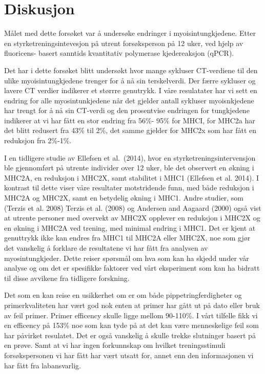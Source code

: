 \documentclass[
  letterpaper,
  DIV=11,
  numbers=noendperiod]{scrreprt}
\begin{document}
\section{Diskusjon}\label{diskusjon-6}

Målet med dette forsøket var å undersøke endringer i myoisintungkjedene.
Etter en styrketreningsintevesjon på utrent forsøksperson på 12 uker,
ved hjelp av fluoricens- basert sanntids kvantitativ polymerase
kjedereaksjon (qPCR).

Det har i dette forsøket blitt undersøkt hvor mange sykluser CT-verdiene
til den ulike myoisintungkjedene trenger for å nå sin terskelverdi. Der
færre sykluser og lavere CT verdier indikerer et størrre genutrykk. I
våre resulatater har vi sett en endring for alle myosintunkjedene når
det gjelder antall sykluser myoisnkjedene har trengt for å nå sin
CT-verdi og den prosentvise endringen for tungkjedene indikerer at vi
har fått en stor endring fra 56\%- 95\% for MHCI, for MHC2a har det
blitt redusert fra 43\% til 2\%, det samme gjelder for MHC2x som har
fått en reduksjon fra 2\%-1\%.

I en tidligere studie av Ellefsen et al.~(2014), hvor en
styrketreningsintervensjon ble gjennomført på utrente individer over 12
uker, ble det observert en økning i MHC2A, en reduksjon i MHC2X, samt
stabilitet i MHC1 (Ellefsen et al. 2014). I kontrast til dette viser
våre resultater motstridende funn, med både reduksjon i MHC2A og MHC2X,
samt en betydelig økning i MHC1. Andre studier, som (Terzis et al. 2008)
Terzis et al. (2008) og Andersen and Aagaard (2000) også vist at utrente
personer med overvekt av MHC2X opplever en reduksjon i MHC2X og en
økning i MHC2A ved trening, med minimal endring i MHC1. Det er kjent at
genuttrykk ikke kan endres fra MHC1 til MHC2A eller MHC2X, noe som gjør
det vanskelig å forklare de resultatene vi har fått fra analysen av
myosintungkjeder. Dette reiser spørsmål om hva som kan ha skjedd under
vår analyse og om det er spesifikke faktorer ved vårt eksperiment som
kan ha bidratt til disse avvikene fra tidligere forskning.

Det som en kan reise en usikkerhet om er om både pippetringferdigheter
og primerkvaliteten har vært god nok enten at primer har gått ut på dato
eller bruk av feil primer. Primer efficency skulle ligge mellom
90-110\%. I vårt tilfelle fikk vi en efficency på 153\% noe som kan tyde
på at det kan være menneskelige feil som har påvirket resulatet. Det er
også vanskelig å skulle trekke slutninger basert på en prøve. Samt at vi
har ingen forkunnskap om hvilket treningsstimuli forsøkspersonen vi har
fått har vært utsatt for, annet enn den informasjonen vi har fått fra
labansvarlig.
\end{document}

